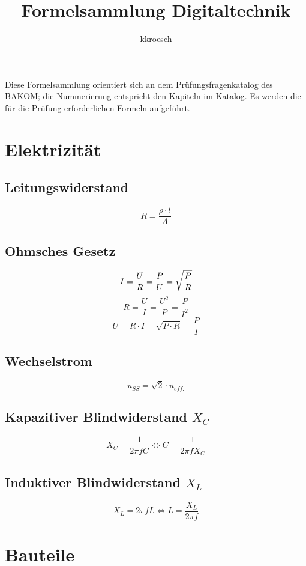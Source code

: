 \documentclass[10pt,landscape]{scrartcl}
\author{kkroesch}
\title{Formelsammlung Digitaltechnik}
\begin{document}
\setlength{\columnsep}{1cm}
\begin{multicols}{3}

\noindent
Diese Formelsammlung orientiert sich an dem Prüfungsfragenkatalog des BAKOM;
die Nummerierung entspricht den Kapiteln im Katalog.
Es werden die für die Prüfung erforderlichen Formeln aufgeführt.

\section{Elektrizität}

\noindent
{}

\subsection*{Leitungswiderstand}

$$ R = \frac{\rho \cdot l}{A} $$

\subsection*{Ohmsches Gesetz}

$$ I = \frac{U}{R} = \frac{P}{U} = \sqrt{P \over R} $$
$$ R = \frac{U}{I} = \frac{U^2}{P} = \frac{P}{I^2} $$
$$ U= R \cdot I = \sqrt{P\cdot R} = \frac{P}{I} $$

\subsection*{Wechselstrom}

$$ u_{SS} = \sqrt{2}\cdot u_{eff.} $$

\subsection*{Kapazitiver Blindwiderstand $X_C$}
$$ X_C =  \frac{1}{2 \pi f C} \Longleftrightarrow C =  \frac{1}{2 \pi f X_C} $$

\subsection*{Induktiver Blindwiderstand $X_L$}
$$ X_L =  2 \pi f L \Longleftrightarrow L =  \frac{X_L}{2 \pi f} $$

\section{Bauteile}


\end{multicols}
\end{document}

